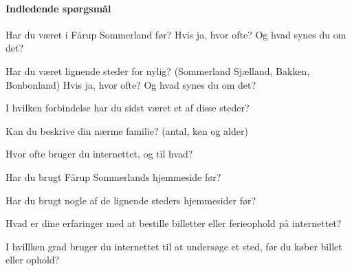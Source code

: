 \documentclass[10pt,a4paper]{article}      %
\begin{document}
\paragraph{Indledende spørgsmål}
\begin{opgaver}
\item Har du været i Fårup Sommerland før? Hvis ja, hvor ofte? Og hvad synes du
om det?
\item Har du været lignende steder for nylig? (Sommerland Sjælland, Bakken,
Bonbonland) Hvis ja, hvor ofte? Og hvad synes du om det?
\item I hvilken forbindelse har du sidst været et af disse steder?
\item Kan du beskrive din nærme familie? (antal, køn og alder)
\item Hvor ofte bruger du internettet, og til hvad?
\item Har du brugt Fårup Sommerlands hjemmeside før?
\item Har du brugt nogle af de lignende steders hjemmesider før?
\item Hvad er dine erfaringer med at bestille billetter eller ferieophold på
internettet?
\item I hvillken grad bruger du internettet til at undersøge et sted, før du
køber billet eller ophold?
\end{opgaver}

\newcommand{\note}[1]{\newline {\small\it Note: #1}}
\end{document}
